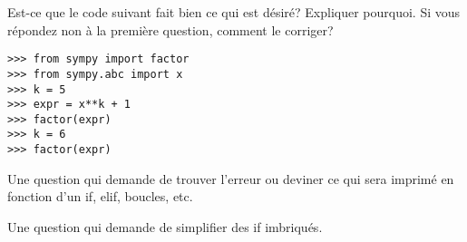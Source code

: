 \begin{exercice}
Est-ce que le code suivant fait bien ce qui est désiré? Expliquer pourquoi.
Si vous répondez non à la première question, comment le corriger?
\begin{verbatim}
>>> from sympy import factor
>>> from sympy.abc import x
>>> k = 5
>>> expr = x**k + 1
>>> factor(expr)
>>> k = 6
>>> factor(expr)
\end{verbatim}
\end{exercice}


\begin{question}
    Une question qui demande de trouver l'erreur ou deviner ce qui sera
    imprimé en fonction d'un if, elif, boucles, etc.
\end{question}

\begin{question}
    Une question qui demande de simplifier des if imbriqués.
\end{question}

